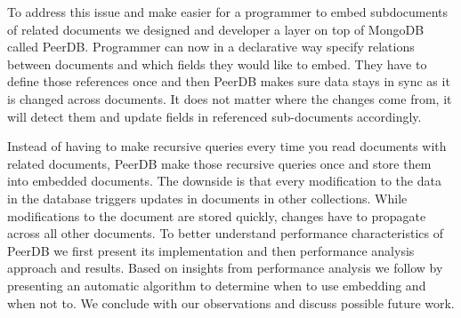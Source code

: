 To address this issue and make easier for a programmer to embed subdocuments of related documents we designed and developer a layer on top of MongoDB called PeerDB.
Programmer can now in a declarative way specify relations between documents and which fields they would like to embed.
They have to define those references once and then PeerDB makes sure data stays in sync as it is changed across documents.
It does not matter where the changes come from, it will detect them and update fields in referenced sub-documents accordingly.

Instead of having to make recursive queries every time you read documents with related documents, PeerDB make those recursive queries once and store them into embedded documents.
The downside is that every modification to the data in the database triggers updates in documents in other collections.
While modifications to the document are stored quickly, changes have to propagate across all other documents.
To better understand performance characteristics of PeerDB we first present its implementation and then performance analysis approach and results.
Based on insights from performance analysis we follow by presenting an automatic algorithm to determine when to use embedding and when not to.
We conclude with our observations and discuss possible future work.
